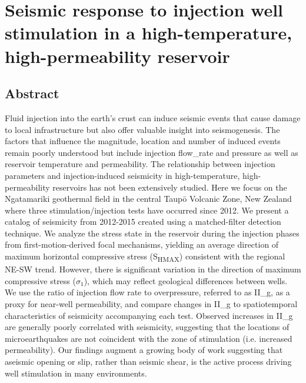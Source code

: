 \chapter[Seismic response to injection well stimulation in a high-temperature,
high-permeability reservoir]{Seismic response to injection well \\ stimulation in a high-temperature,
\\high-permeability reservoir}

\section*{Abstract}
Fluid injection into the earth's crust can induce seismic events that
cause damage to local infrastructure but also offer valuable insight
into seismogenesis. The factors that influence the magnitude, location
and number of induced events remain poorly understood but include
injection \gls{flow_rate} and pressure as well as reservoir temperature and
\gls{permeability}. The relationship between injection parameters and
injection-induced seismicity in high-temperature, high-permeability
reservoirs has not been extensively studied. Here we focus on the
Ngatamariki geothermal field in the central Taup\={o} Volcanic Zone, New
Zealand where three \gls{stimulation}\slash{injection} tests have occurred since
2012. We present a catalog of seismicity from 2012-2015 created using a
matched-filter detection technique. We analyze the stress state in the
reservoir during the injection phases from first-motion-derived focal
mechanisms, yielding an average direction of maximum horizontal
compressive stress (S\textsubscript{HMAX}) consistent with the regional
NE-SW trend. However, there is significant variation in the direction of
maximum compressive stress (\(\sigma_{1}\)), which may reflect
geological differences between wells. We use the ratio of injection flow
rate to overpressure, referred to as \gls{II_g}, as a proxy for
near-well \gls{permeability}, and compare changes in \gls{II_g} to
spatiotemporal characteristics of seismicity accompanying each test.
Observed increases in \gls{II_g} are generally poorly correlated
with seismicity, suggesting that the locations of microearthquakes are
not coincident with the zone of \gls{stimulation} (i.e. increased
\gls{permeability}). Our findings augment a growing body of work suggesting
that aseismic opening or slip, rather than seismic shear, is the active
process driving well \gls{stimulation} in many environments.

